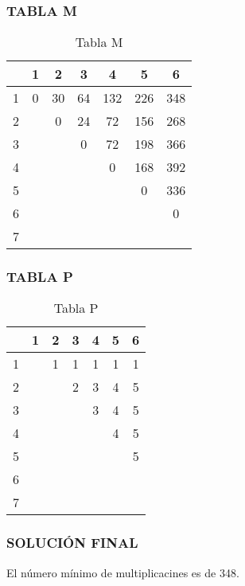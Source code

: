 \documentclass[10]{beamer}
\begin{document}
\begin{frame}\frametitle{TABLA M}
 \color{white}
\begin{table}
 \begin{tabular}{ c | c  | c  | c  | c  | c  | c }
 \\    & 1   & 2   & 3   & 4   & 5   & 6  \\ 
 \hline \hline 
  1 & 0& 30& 64& 132& 226& 348 \\ 
  2  & & 0& 24& 72& 156& 268 \\ 
  3  &  & & 0& 72& 198& 366 \\ 
  4  &  &  & & 0& 168& 392 \\ 
  5  &  &  &  & & 0& 336 \\ 
  6  &  &  &  &  & & 0 \\ 
  7  &  &  &  &  &  &  \\ 
  
 \end{tabular}
 \color{white}
\caption{Tabla M}
 \end{table}
 \end{frame} 
\begin{frame}\frametitle{TABLA P}
 \color{white}
\begin{table}
 \begin{tabular}{ c | c  | c  | c  | c  | c  | c }
 \\    & 1   & 2   & 3   & 4   & 5   & 6  \\ 
 \hline \hline 
  1  & & 1& 1& 1& 1& 1 \\ 
  2  &  & & 2& 3& 4& 5 \\ 
  3  &  &  & & 3& 4& 5 \\ 
  4  &  &  &  & & 4& 5 \\ 
  5  &  &  &  &  & & 5 \\ 
  6  &  &  &  &  &  &  \\ 
  7  &  &  &  &  &  &  \\ 
  
 \end{tabular}
 \color{white}
\caption{Tabla P}
 \end{table}
 \end{frame} 
\begin{frame}
\color{white}
\frametitle{SOLUCI\'ON FINAL}
El n\'umero m\'inimo de multiplicacines es de 348.
\end{frame} 
\end{document}
